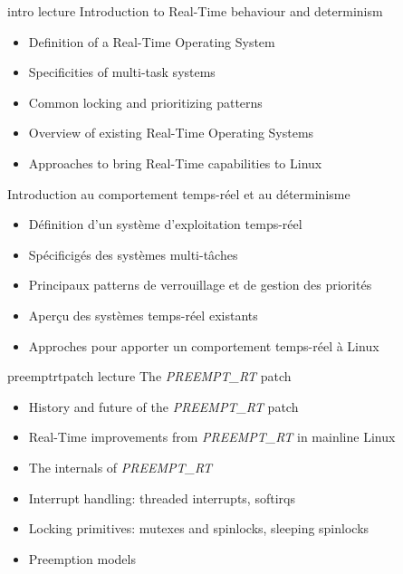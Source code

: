 
\def \trainers {
  Maxime Chevallier
  \newline \url{https://bootlin.com/company/staff/maxime-chevallier/}
}

\def \onsitelecturetimeratio{50}
\def \onsitelabtimeratio{50}


{intro}
{lecture}
{Introduction to Real-Time behaviour and determinism}
{
  \begin{itemize}
  \item Definition of a Real-Time Operating System
  \item Specificities of multi-task systems
  \item Common locking and prioritizing patterns
  \item Overview of existing Real-Time Operating Systems
  \item Approaches to bring Real-Time capabilities to Linux
  \end{itemize}
}
{Introduction au comportement temps-réel et au déterminisme}
{
  \begin{itemize}
  \item Définition d'un système d'exploitation temps-réel
  \item Spécificigés des systèmes multi-tâches
  \item Principaux patterns de verrouillage et de gestion des priorités
  \item Aperçu des systèmes temps-réel existants
  \item Approches pour apporter un comportement temps-réel à Linux
  \end{itemize}
}
{preemptrtpatch}
{lecture}
{The {\em PREEMPT\_RT} patch}
{
  \begin{itemize}
  \item History and future of the {\em PREEMPT\_RT} patch
  \item Real-Time improvements from {\em PREEMPT\_RT} in mainline Linux
  \item The internals of {\em PREEMPT\_RT}
  \item Interrupt handling: threaded interrupts, softirqs
  \item Locking primitives: mutexes and spinlocks, sleeping spinlocks
  \item Preemption models
  \end{itemize}
}
